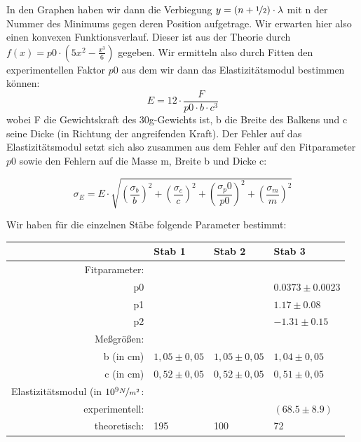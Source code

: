 In den Graphen haben wir dann die Verbiegung $y = (n + \nicefrac{1}{2}) \cdot \lambda$ mit n der Nummer des Minimums gegen deren Position aufgetrage. Wir erwarten hier also einen konvexen Funktionsverlauf. Dieser ist aus der Theorie durch 
$f(x) = p0 \cdot (5 x^2  - \frac{x^3}{6})$ gegeben. Wir ermitteln also durch Fitten den experimentellen Faktor $p0$ aus dem wir dann das Elastizitätsmodul bestimmen können: 
\[
 E = 12 \cdot \frac{F}{  p0 \cdot b \cdot c^3}
\]
wobei F die Gewichtskraft des 30g-Gewichts ist, b die Breite des Balkens und c seine Dicke (in Richtung der angreifenden Kraft). Der Fehler auf das Elastizitätsmodul setzt sich also zusammen aus dem Fehler auf den Fitparameter $p0$ sowie den Fehlern auf die Masse m, Breite b und Dicke c:

\[
  \sigma_E = E \cdot \sqrt{\left(\frac{\sigma_b}{b}\right)^2 + \left(\frac{\sigma_c}{c}\right)^2 + \left(\frac{\sigma_p0}{p0}\right)^2 + \left(\frac{\sigma_m}{m}\right)^2}
\]

Wir haben für die einzelnen Stäbe folgende Parameter bestimmt:


\begin{tabular}{rlll}
 \toprule
 & Stab 1 & Stab 2 & Stab 3 \\
 \midrule
Fitparameter:\\
 p0 & & & $0.0373 \pm 0.0023$\\ %
 p1 & & & $1.17 \pm 0.08$\\
 p2 & & & $-1.31 \pm 0.15$\\
Meßgrößen:\\
b (in cm) &$1,05 \pm 0,05$ & $1,05 \pm 0,05$ & $1,04 \pm 0,05$ \\
c (in cm) & $0,52 \pm 0,05$ & $0,52 \pm 0,05$ & $0,51 \pm 0,05$ \\
Elastizitätsmodul (in $10^9 \nicefrac{N}{m^2}$:\\
experimentell: & & & $(68.5 \pm 8.9) $ \\
theoretisch: & 195 & 100 & 72 \\
\bottomrule
\end{tabular}

